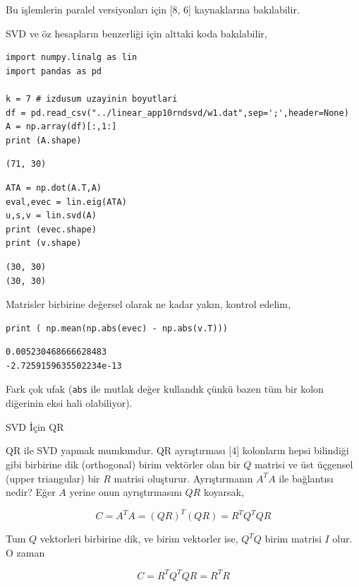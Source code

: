\documentclass[12pt,fleqn]{article}\usepackage{../../common}
\begin{document}
Bu işlemlerin paralel versiyonları için [8, 6] kaynaklarına bakılabilir.

SVD ve öz hesapların benzerliği için alttaki koda bakılabilir,

\begin{verbatim}
import numpy.linalg as lin
import pandas as pd

k = 7 # izdusum uzayinin boyutlari
df = pd.read_csv("../linear_app10rndsvd/w1.dat",sep=';',header=None)
A = np.array(df)[:,1:]
print (A.shape)
\end{verbatim}

\begin{verbatim}
(71, 30)
\end{verbatim}

\begin{verbatim}
ATA = np.dot(A.T,A)
eval,evec = lin.eig(ATA)
u,s,v = lin.svd(A)
print (evec.shape)
print (v.shape)
\end{verbatim}

\begin{verbatim}
(30, 30)
(30, 30)
\end{verbatim}

Matrisler birbirine değersel olarak ne kadar yakın, kontrol edelim,

\begin{verbatim}
print ( np.mean(np.abs(evec) - np.abs(v.T)))
\end{verbatim}

\begin{verbatim}
0.005230468666628483
-2.7259159635502234e-13
\end{verbatim}

Fark çok ufak (\verb!abs! ile mutlak değer kullandık çünkü bazen tüm bir kolon
diğerinin eksi hali olabiliyor).

SVD İçin QR

QR ile SVD yapmak mumkundur. QR ayrıştırması [4] kolonların hepsi bilindiği gibi
birbirine dik (orthogonal) birim vektörler olan bir $Q$ matrisi ve üst üçgensel
(upper triangular) bir $R$ matrisi oluşturur. Ayrıştırmanın $A^TA$ ile
bağlantısı nedir? Eğer $A$ yerine onun ayrıştırmasını $QR$ koyarsak,

$$
C = A^TA = (QR)^T (QR) = R^T Q^T QR
$$

Tum $Q$ vektorleri birbirine dik, ve birim vektorler ise, $Q^T Q$
birim matrisi $I$ olur. O zaman

$$
C = R^T Q^T QR = R^T R
$$
\end{document}
